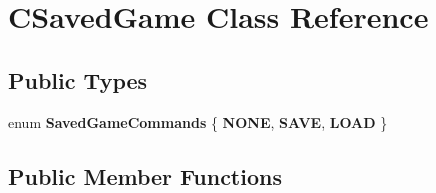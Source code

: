 \hypertarget{class_c_saved_game}{
\section{CSavedGame Class Reference}
\label{class_c_saved_game}
}
\subsection*{Public Types}
\begin{DoxyCompactItemize}
\item 
enum {\bfseries SavedGameCommands} \{ {\bfseries NONE}, 
{\bfseries SAVE}, 
{\bfseries LOAD}
 \}
\end{DoxyCompactItemize}
\subsection*{Public Member Functions}
